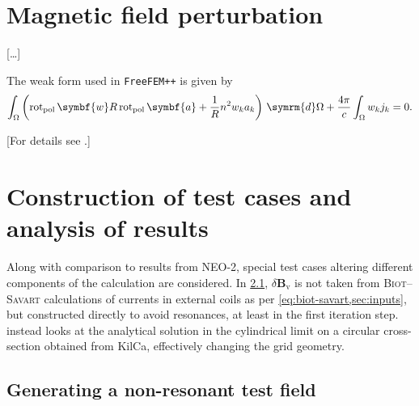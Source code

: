\documentclass[a4paper, twoside, 10pt, english]{article}
\numberwithin{equation}{section}
\let\vec\symbf
\newcommand*\diff{\ensuremath{\symrm{d}}}  %
\newcommand*\pol{\ensuremath{\textrm{pol}}}  %
\newcommand*\polCurl{\ensuremath{\operatorname{rot}_{\pol}}}  %
\newcommand*\Bvac{\ensuremath{\delta \vec{B}_{\text{v}}}}  %
\begin{document}
\clearpage
\section{Magnetic field perturbation}
\label{sec:compute_Bn}

[\ldots]

The weak form used in \texttt{FreeFEM++} is given by  %
\begin{gather}
  \int_{\Omega} \left ( \polCurl \vec{w} R \polCurl \vec{a} + \frac{1}{R} n^{2} w_{k} a_{k} \right ) \, \diff \Omega + \frac{4 \pi}{c} \int_{\Omega} w_{k} j_{k} = 0.
\end{gather}

[For details see \cite{Albert19,Biro15,Hecht12,Jin02}.]

\clearpage
\section{Construction of test cases and analysis of results}

Along with comparison to results from NEO-2, special test cases altering different components of the calculation are considered. In \cref{sec:nonres}, $\Bvac$ is not taken from \textsc{Biot}--\textsc{Savart} calculations of currents in external coils as per \cref{eq:biot-savart,sec:inputs}, but constructed directly to avoid resonances, at least in the first iteration step.  instead looks at the analytical solution in the cylindrical limit on a circular cross-section obtained from KilCa, effectively changing the grid geometry.

\subsection{Generating a non-resonant test field}
\label{sec:nonres}
\end{document}
